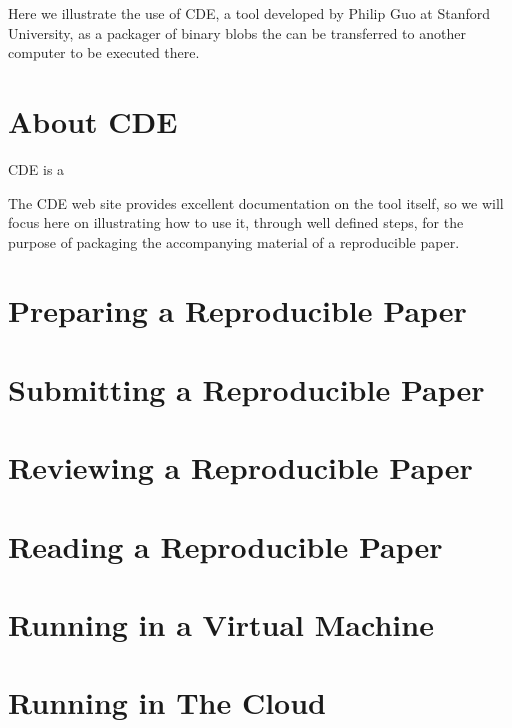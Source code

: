 \documentclass{InsightArticle}
\begin{document}
Here we illustrate the use of CDE, a tool developed by Philip Guo at Stanford
University, as a packager of binary blobs the can be transferred to another
computer to be executed there.

\section{About CDE}

CDE is a

The CDE web site provides excellent documentation on the tool itself, so we
will focus here on illustrating how to use it, through well defined steps, for
the purpose of packaging the accompanying material of a reproducible paper.

\section{Preparing a Reproducible Paper}

\section{Submitting a Reproducible Paper}

\section{Reviewing a Reproducible Paper}

\section{Reading a Reproducible Paper}

\section{Running in a Virtual Machine}

\section{Running in The Cloud}

%
%



\end{document}
